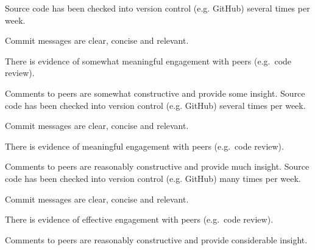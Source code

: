 \documentclass{../../fal_assignment}
\begin{document}
\begin{markingrubric}
        \grade Source code  has been checked into version control (e.g. GitHub) several times per week.
            \par Commit messages are clear, concise and relevant.
            \par There is evidence of somewhat meaningful engagement with peers (e.g.\ code review).
            \par Comments to peers are somewhat constructive and provide some insight.
        \grade Source code has been checked into version control (e.g. GitHub) several times per week.
            \par Commit messages are clear, concise and relevant.
            \par There is evidence of meaningful engagement with peers (e.g.\ code review).
            \par Comments to peers are reasonably constructive and provide much insight.
        \grade Source code has been checked into version control (e.g. GitHub) many times per week.
            \par Commit messages are clear, concise and relevant.
            \par There is evidence of effective engagement with peers (e.g.\ code review).
            \par Comments to peers are reasonably constructive and provide considerable insight.
%
\end{markingrubric}
\end{document}
